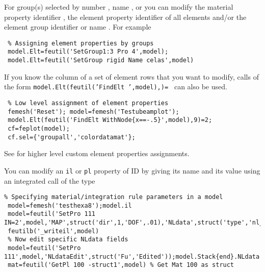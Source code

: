 
 For group(s) selected by number , name , or  you can modify the material property identifier , the element property identifier  of all elements and/or the element group identifier  or name . For example

\begin{verbatim}
 % Assigning element properties by groups
 model.Elt=feutil('SetGroup1:3 Pro 4',model);
 model.Elt=feutil('SetGroup rigid Name celas',model) 
\end{verbatim}

If you know the column of a set of element rows that you want to modify, calls of the form {\tt model.Elt(feutil('FindElt ',model),)= } can also be used. 

\begin{verbatim}
 % Low level assignment of element properties
 femesh('Reset'); model=femesh('Testubeamplot');
 model.Elt(feutil('FindElt WithNode{x==-.5}',model),9)=2;
 cf=feplot(model); 
 cf.sel={'groupall','colordatamat'};
\end{verbatim}%

See  for higher level custom element properties assignments.


 You can modify an {\tt il} or {\tt pl} property of ID  by giving its name and its value using an integrated call of the type

\begin{verbatim}
% Specifying material/integration rule parameters in a model
 model=femesh('testhexa8');model.il
 model=feutil('SetPro 111 IN=2',model,'MAP',struct('dir',1,'DOF',.01),'NLdata',struct('type','nl_inout'));
 feutilb('_writeil',model)
 % Now edit specific NLdata fields
 model=feutil('SetPro 111',model,'NLdataEdit',struct('Fu','Edited'));model.Stack{end}.NLdata
 mat=feutil('GetPl 100 -struct1',model) % Get Mat 100 as struct
\end{verbatim}%

